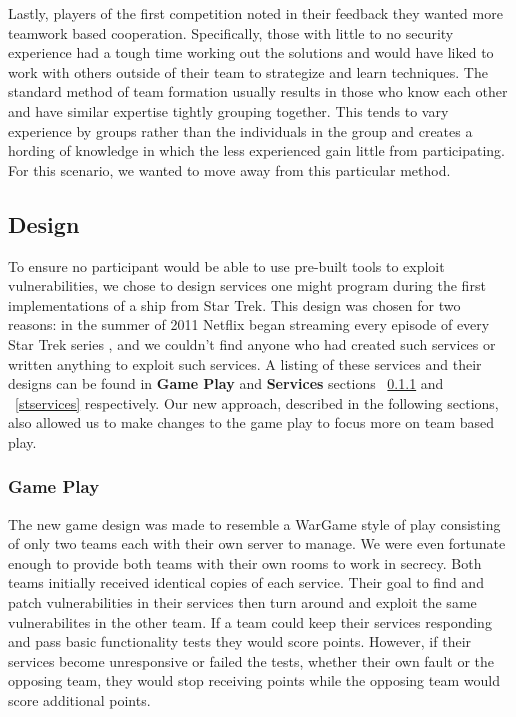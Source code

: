 \documentclass[10pt]{article}
\begin{document}
Lastly, players of the first competition noted in their feedback they wanted
more teamwork based cooperation. Specifically, those with little to no security
experience had a tough time working out the solutions and would have liked to
work with others outside of their team to strategize and learn techniques. The
standard method of team formation usually results in those who know each other
and have similar expertise tightly grouping together. This tends to vary
experience by groups rather than the individuals in the group and creates a
hording of knowledge in which the less experienced gain little from
participating. For this scenario, we wanted to move away from this particular
method.

\subsection{Design}
\label{stdesign}
To ensure no participant would be able to use pre-built tools to exploit
vulnerabilities, we chose to design services one might program during the first
implementations of a ship from Star Trek. This design was chosen
for two reasons: in the summer of 2011 Netflix began streaming every episode of
every Star Trek series \cite{Netflix}, and we couldn't find anyone who
had created such services or written anything to exploit such services. A
listing of these services and their designs can be found in \textbf{Game Play}
and \textbf{Services} sections ~\ref{stgameplay} and ~\ref{stservices}
respectively. Our new approach, described in the following sections, also
allowed us to make changes to the game play to focus more on team based play.

\subsubsection{Game Play}
\label{stgameplay}
The new game design was made to resemble a WarGame style of play consisting of
only two teams each with their own server to manage. We were even fortunate
enough to provide both teams with their own rooms to work in secrecy. Both
teams initially received identical copies of each service. Their goal to find
and patch vulnerabilities in their services then turn around and exploit the
same vulnerabilites in the other team. If a team could keep their services
responding and pass basic functionality tests they would score points. However,
if their services become unresponsive or failed the tests, whether their own
fault or the opposing team, they would stop receiving points while the opposing
team would score additional points.
\end{document}
